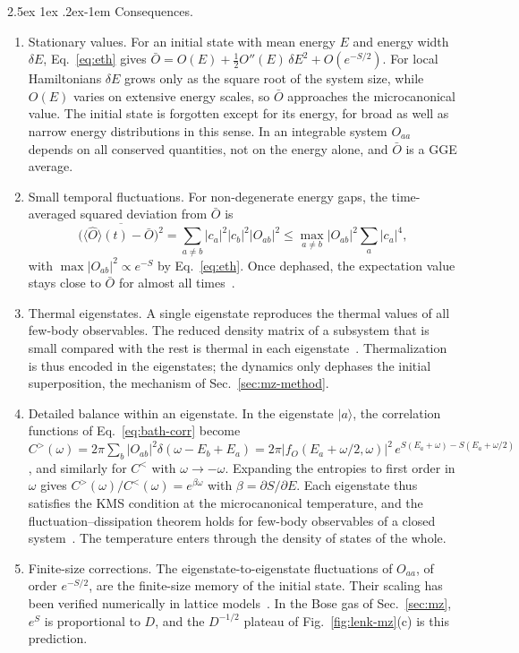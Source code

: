 \documentclass[10pt,a4paper]{article}
\makeatletter
\renewcommand{\paragraph}{\@startsection{paragraph}{4}{\z@}%
  {2.5ex \@plus 1ex \@minus .2ex}{-1em}%
  {\normalfont\fontsize{14pt}{17pt}\selectfont\bfseries}}
\makeatother
\begin{document}
\paragraph{Consequences.}
\begin{enumerate}[label=(E\arabic*), leftmargin=3.0em]
\item Stationary values. For an initial state with mean energy $ E $ and energy width $ \delta E $, Eq.~\eqref{eq:eth} gives $ \bar O = O(E) + \tfrac12 O''(E)\,\delta E^2 + O(e^{-S/2}) $. For local Hamiltonians $ \delta E $ grows only as the square root of the system size, while $ O(E) $ varies on extensive energy scales, so $ \bar O $ approaches the microcanonical value. The initial state is forgotten except for its energy, for broad as well as narrow energy distributions in this sense. In an integrable system $ O_{aa} $ depends on all conserved quantities, not on the energy alone, and $ \bar O $ is a GGE average.
\item Small temporal fluctuations. For non-degenerate energy gaps, the time-averaged squared deviation from $ \bar O $ is
\begin{equation*}
  \overline{\big( \langle\hat O\rangle(t) - \bar O \big)^2}
  = \sum_{a \neq b} |c_a|^2 |c_b|^2 |O_{ab}|^2
  \le \max_{a\neq b} |O_{ab}|^2 \sum_a |c_a|^4 ,
\end{equation*}
with $ \max |O_{ab}|^2 \propto e^{-S} $ by Eq.~\eqref{eq:eth}. Once dephased, the expectation value stays close to $ \bar O $ for almost all times~\cite{Reimann2008}.
\item Thermal eigenstates. A single eigenstate reproduces the thermal values of all few-body observables. The reduced density matrix of a subsystem that is small compared with the rest is thermal in each eigenstate~\cite{Garrison2018}. Thermalization is thus encoded in the eigenstates; the dynamics only dephases the initial superposition, the mechanism of Sec.~\ref{sec:mz-method}.
\item Detailed balance within an eigenstate. In the eigenstate $ |a\rangle $, the correlation functions of Eq.~\eqref{eq:bath-corr} become $ C^>(\omega) = 2\pi \sum_b |O_{ab}|^2 \delta(\omega - E_b + E_a) = 2\pi |f_O(E_a + \omega/2, \omega)|^2 \, e^{S(E_a + \omega) - S(E_a + \omega/2)} $, and similarly for $ C^< $ with $ \omega \to -\omega $. Expanding the entropies to first order in $ \omega $ gives $ C^>(\omega)/C^<(\omega) = e^{\beta\omega} $ with $ \beta = \partial S/\partial E $. Each eigenstate thus satisfies the KMS condition at the microcanonical temperature, and the fluctuation--dissipation theorem holds for few-body observables of a closed system~\cite{DAlessio2016}. The temperature enters through the density of states of the whole.
\item Finite-size corrections. The eigenstate-to-eigenstate fluctuations of $ O_{aa} $, of order $ e^{-S/2} $, are the finite-size memory of the initial state. Their scaling has been verified numerically in lattice models~\cite{Beugeling2014,Kim2014}. In the Bose gas of Sec.~\ref{sec:mz}, $ e^{S} $ is proportional to $ D $, and the $ D^{-1/2} $ plateau of Fig.~\ref{fig:lenk-mz}(c) is this prediction.
\end{enumerate}
\end{document}
